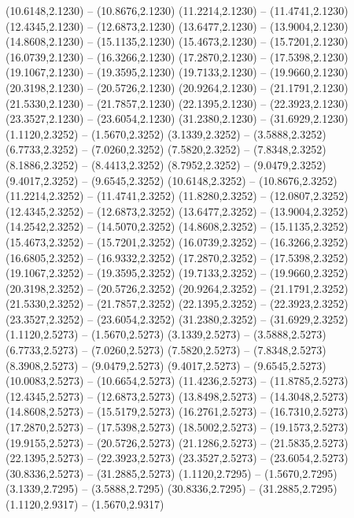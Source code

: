 {\begin{scope}[shift={(#1,#2)}]
    (10.6148,2.1230) -- (10.8676,2.1230)
    (11.2214,2.1230) -- (11.4741,2.1230)
    (12.4345,2.1230) -- (12.6873,2.1230)
    (13.6477,2.1230) -- (13.9004,2.1230)
    (14.8608,2.1230) -- (15.1135,2.1230)
    (15.4673,2.1230) -- (15.7201,2.1230)
    (16.0739,2.1230) -- (16.3266,2.1230)
    (17.2870,2.1230) -- (17.5398,2.1230)
    (19.1067,2.1230) -- (19.3595,2.1230)
    (19.7133,2.1230) -- (19.9660,2.1230)
    (20.3198,2.1230) -- (20.5726,2.1230)
    (20.9264,2.1230) -- (21.1791,2.1230)
    (21.5330,2.1230) -- (21.7857,2.1230)
    (22.1395,2.1230) -- (22.3923,2.1230)
    (23.3527,2.1230) -- (23.6054,2.1230)
    (31.2380,2.1230) -- (31.6929,2.1230)
    (1.1120,2.3252) -- (1.5670,2.3252)
    (3.1339,2.3252) -- (3.5888,2.3252)
    (6.7733,2.3252) -- (7.0260,2.3252)
    (7.5820,2.3252) -- (7.8348,2.3252)
    (8.1886,2.3252) -- (8.4413,2.3252)
    (8.7952,2.3252) -- (9.0479,2.3252)
    (9.4017,2.3252) -- (9.6545,2.3252)
    (10.6148,2.3252) -- (10.8676,2.3252)
    (11.2214,2.3252) -- (11.4741,2.3252)
    (11.8280,2.3252) -- (12.0807,2.3252)
    (12.4345,2.3252) -- (12.6873,2.3252)
    (13.6477,2.3252) -- (13.9004,2.3252)
    (14.2542,2.3252) -- (14.5070,2.3252)
    (14.8608,2.3252) -- (15.1135,2.3252)
    (15.4673,2.3252) -- (15.7201,2.3252)
    (16.0739,2.3252) -- (16.3266,2.3252)
    (16.6805,2.3252) -- (16.9332,2.3252)
    (17.2870,2.3252) -- (17.5398,2.3252)
    (19.1067,2.3252) -- (19.3595,2.3252)
    (19.7133,2.3252) -- (19.9660,2.3252)
    (20.3198,2.3252) -- (20.5726,2.3252)
    (20.9264,2.3252) -- (21.1791,2.3252)
    (21.5330,2.3252) -- (21.7857,2.3252)
    (22.1395,2.3252) -- (22.3923,2.3252)
    (23.3527,2.3252) -- (23.6054,2.3252)
    (31.2380,2.3252) -- (31.6929,2.3252)
    (1.1120,2.5273) -- (1.5670,2.5273)
    (3.1339,2.5273) -- (3.5888,2.5273)
    (6.7733,2.5273) -- (7.0260,2.5273)
    (7.5820,2.5273) -- (7.8348,2.5273)
    (8.3908,2.5273) -- (9.0479,2.5273)
    (9.4017,2.5273) -- (9.6545,2.5273)
    (10.0083,2.5273) -- (10.6654,2.5273)
    (11.4236,2.5273) -- (11.8785,2.5273)
    (12.4345,2.5273) -- (12.6873,2.5273)
    (13.8498,2.5273) -- (14.3048,2.5273)
    (14.8608,2.5273) -- (15.5179,2.5273)
    (16.2761,2.5273) -- (16.7310,2.5273)
    (17.2870,2.5273) -- (17.5398,2.5273)
    (18.5002,2.5273) -- (19.1573,2.5273)
    (19.9155,2.5273) -- (20.5726,2.5273)
    (21.1286,2.5273) -- (21.5835,2.5273)
    (22.1395,2.5273) -- (22.3923,2.5273)
    (23.3527,2.5273) -- (23.6054,2.5273)
    (30.8336,2.5273) -- (31.2885,2.5273)
    (1.1120,2.7295) -- (1.5670,2.7295)
    (3.1339,2.7295) -- (3.5888,2.7295)
    (30.8336,2.7295) -- (31.2885,2.7295)
    (1.1120,2.9317) -- (1.5670,2.9317)

\end{scope}}
